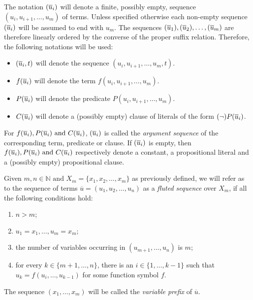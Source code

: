 The notation \(\flseq{i}\) will denote a finite, possibly empty, sequence \((u_i,u_{i+1}, \ldots, u_m)\) of terms. Unless specified otherwise each non-empty sequence \(\flseq{i}\) will be assumed to end with \(u_m\).
The sequences \(\flseq{1},\flseq{2},\ldots,\flseq{m}\) are therefore linearly ordered by the converse of the proper suffix relation.
Therefore, the following notations will be used:
\begin{itemize}
  \item \(\flseq{i}[t]\) will denote the sequence \((u_i,u_{i+1}, \ldots, u_m,t)\).
  \item \(f\flseq{i}\) will denote the term \(f(u_i,u_{i+1}, \ldots, u_m)\).
  \item \(P\flseq{i}\) will denote the predicate \(P(u_i,u_{i+1}, \ldots, u_m)\).
  \item \(C\flseq{i}\) will denote a (possibly empty) clause of literals of the form \((\neg)P\flseq{i}\).
\end{itemize}

For \(f\flseq{i},P\flseq{i} \text{ and } C\flseq{i} \), \(\flseq{i}\) is called the \emph{argument sequence} of the corresponding term, predicate or clause.
If \(\flseq{i}\) is empty, then \(f\flseq{i}, P\flseq{i} \text{ and } C\flseq{i}\) respectively denote a constant, a propositional literal and a (possibly empty) propositional clause.

\begin{definition}\label{def:fluted-sequence}
Given \(m,n \in \mathbb{N} \text{ and } X_m = \{x_1,x_2,\ldots,x_m\}\) as previously defined, we will refer as to the sequence of terms \(\overline{u} = (u_1,u_2,\ldots,u_n)\) as a \emph{fluted sequence} over \(X_m\), if all the following conditions hold:
\begin{enumerate}[label= (\roman*)]
  \item \(n > m\);
  \item \(u_1=x_1,\ldots,u_m=x_m\);
  \item the number of variables occurring in \((u_{m+1},\ldots,u_n)\) is \(m\);
  \item for every \(k \in \{m+1,\ldots,n\}\), there is an \(i \in \{1,\ldots,k-1\}\) such that \\\(u_k = f(u_i,\ldots,u_{k-1})\) for some function symbol \(f\).
\end{enumerate}
The sequence \((x_1, \ldots, x_m)\) will be called the \emph{variable prefix} of \(\overline{u}\).
\end{definition}

